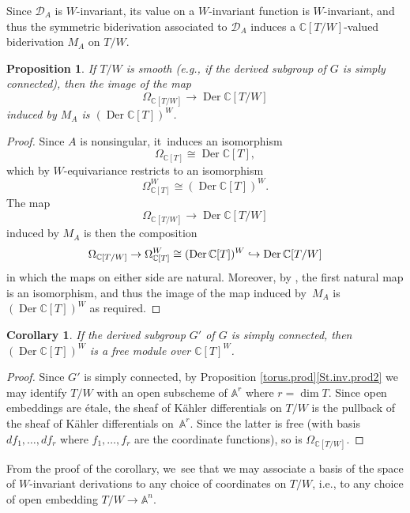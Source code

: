 \documentclass[JEP,XML,SOM,Unicode,NoFloatCountersInSection,published]{cedram}
\newcommand\hto{\mathrel{\lhook\joinrel\to}}
\newtheorem{cor}[equation]{Corollary}
\newtheorem{prop}[equation]{Proposition}
\theoremstyle{definition}
\newcommand{\A}{\mathbb{A}}
\newcommand{\C}{\mathbb{C}}
\newcommand{\mcD}{\mathcal{D}}
\DeclareMathOperator{\Der}{Der}
\begin{document}
Since $\mcD_A$ is $W$-invariant, its value on a $W$-invariant function
is $W$-invariant, and thus the symmetric biderivation associated to $\mcD_A$ induces a $\C[T/W]$-valued biderivation $M_A$ on $T/W$.

\begin{prop}
If $T/W$ is smooth (e.g., if the derived subgroup of $G$ is simply connected), then the image of the map
\[
\Omega_{\C[T/W]}\to \Der \C[T/W]
\]
induced by $M_A$ is $(\Der \C[T])^W$.
\end{prop}

\begin{proof}
Since $A$ is nonsingular, it~induces an isomorphism
\[
\Omega_{\C[T]}\cong \Der \C[T],
\]
which by $W$-equivariance restricts to an isomorphism
\[
\Omega_{\C[T]}^W\cong (\Der \C[T])^W.
\]
The map
\[
\Omega_{\C[T/W]}\to \Der \C[T/W]
\]
induced by $M_A$ is then the composition
\[
\Omega_{\C[T/W]}\to \Omega_{\C[T]}^W\cong (\Der \C[T])^W\hto \Der \C[T/W]
\]
in which the maps on either side are natural. Moreover, by \cite[Cor.\ to
Th.\,II.3]{Knighten}, the first natural map is an isomorphism, and thus
the image of the map induced by~$M_A$ is $(\Der \C[T])^W$ as
required.
\end{proof}

\begin{cor} \label{der.free}
If the derived subgroup $G'$ of $G$ is simply connected, then $(\Der \C[T])^W$ is a free module over $\C[T]^W$.
\end{cor}

\begin{proof}
Since $G'$ is simply connected, by Proposition \ref{torus.prod}\eqref{St.inv.prod2} we may identify $T/W$ with an open subscheme of $\A^r$ where $r=\dim T$. Since open embeddings are étale, the sheaf of Kähler differentials on $T/W$ is the pullback of the sheaf of Kähler differentials on~$\A^r$. Since the latter is free (with basis $df_1,\ldots,df_r$ where $f_1,\dots,f_r$ are the coordinate functions), so is $\Omega_{\C[T/W]}$.
\end{proof}

From the proof of the corollary, we~see that we may associate a basis of
the space of $W$-invariant derivations to any choice of coordinates on
$T/W$, i.e., to any choice of open embedding $T/W\to \A^n$.
\end{document}
